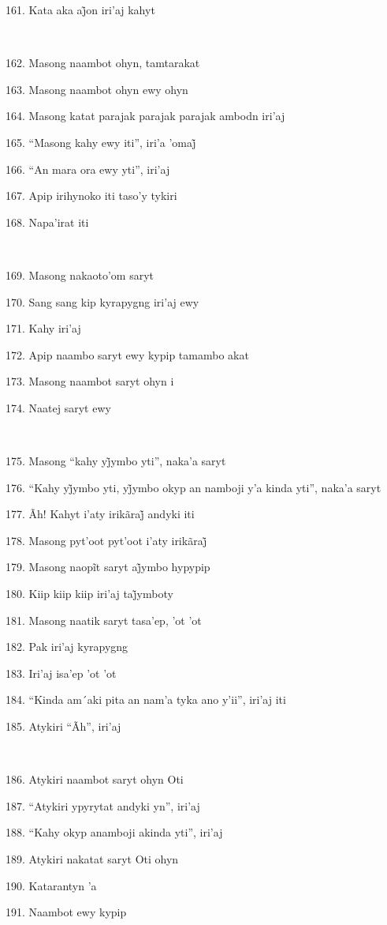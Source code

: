 161. Kata aka aj̃on iri’aj kahyt

~

162. Masong naambot ohyn, tamtarakat

163. Masong naambot ohyn ewy ohyn

164. Masong katat parajak parajak parajak ambodn iri'aj

165. ``Masong kahy ewy iti'', iri’a ’omaj̃

166. ``An mara ora ewy yti'', iri'aj

167. Apip irihynoko iti taso'y tykiri

168. Napa'irat iti

~

169. Masong nakaoto'om saryt

170. Sang sang kip kyrapygng iri'aj ewy

171. Kahy iri'aj

172. Apip naambo saryt ewy kypip tamambo akat

173. Masong naambot saryt ohyn i

174. Naatej saryt ewy

~

175. Masong ``kahy yj̃ymbo yti'', naka’a saryt

176. ``Kahy yj̃ymbo yti, yj̃ymbo okyp an namboji y’a kinda yti'', naka’a saryt

177. Ãh! Kahyt i’aty irikãraj̃ andyki iti

178. Masong pyt’oot pyt’oot i’aty irikãraj̃

179. Masong naopĩt saryt aj̃ymbo hypypip

180. Kiip kiip kiip iri’aj taj̃ymboty

181. Masong naatik saryt tasa'ep, 'ot 'ot

182. Pak iri'aj kyrapygng

183. Iri'aj isa'ep 'ot 'ot

184. ``Kinda am´aki pita an nam'a tyka ano y'ii'', iri'aj iti

185. Atykiri ``Ãh'', iri'aj

~

186. Atykiri naambot saryt ohyn Oti

187. ``Atykiri ypyrytat andyki yn'', iri'aj

188. ``Kahy okyp anamboji akinda yti'', iri'aj

189. Atykiri nakatat saryt Oti ohyn

190. Katarantyn 'a

191. Naambot ewy kypip

